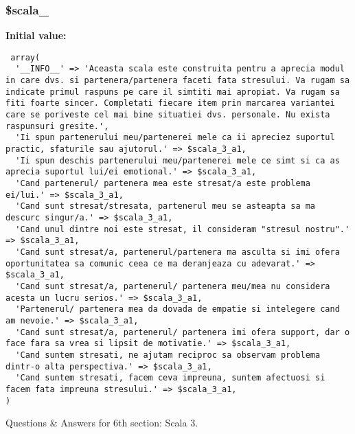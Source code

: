 \subsubsection{\setlength{\rightskip}{0pt plus 5cm}\$scala\_}\label{d1/d7c/a00003_244f3b0b5acb6fc6f405db0fa1dfdd88}


\textbf{Initial value:}

\begin{Code}\begin{verbatim} array(
  '__INFO__' => 'Aceasta scala este construita pentru a aprecia modul in care dvs. si partenera/partenera faceti fata stresului. Va rugam sa indicate primul raspuns pe care il simtiti mai apropiat. Va rugam sa fiti foarte sincer. Completati fiecare item prin marcarea variantei care se poriveste cel mai bine situatiei dvs. personale. Nu exista raspunsuri gresite.',
  'Ii spun partenerului meu/partenerei mele ca ii apreciez suportul practic, sfaturile sau ajutorul.' => $scala_3_a1,
  'Ii spun deschis partenerului meu/partenerei mele ce simt si ca as aprecia suportul lui/ei emotional.' => $scala_3_a1,
  'Cand partenerul/ partenera mea este stresat/a este problema ei/lui.' => $scala_3_a1,
  'Cand sunt stresat/stresata, partenerul meu se asteapta sa ma descurc singur/a.' => $scala_3_a1,
  'Cand unul dintre noi este stresat, il consideram "stresul nostru".' => $scala_3_a1,
  'Cand sunt stresat/a, partenerul/partenera ma asculta si imi ofera oportunitatea sa comunic ceea ce ma deranjeaza cu adevarat.' => $scala_3_a1,
  'Cand sunt stresat/a, partenerul/ partenera meu/mea nu considera acesta un lucru serios.' => $scala_3_a1,
  'Partenerul/ partenera mea da dovada de empatie si intelegere cand am nevoie.' => $scala_3_a1,
  'Cand sunt stresat/a, partenerul/ partenera imi ofera support, dar o face fara sa vrea si lipsit de motivatie.' => $scala_3_a1,
  'Cand suntem stresati, ne ajutam reciproc sa observam problema dintr-o alta perspectiva.' => $scala_3_a1,
  'Cand suntem stresati, facem ceva impreuna, suntem afectuosi si facem fata impreuna stresului.' => $scala_3_a1,
)
\end{verbatim}\end{Code}
Questions \& Answers for 6th section: Scala 3. 

